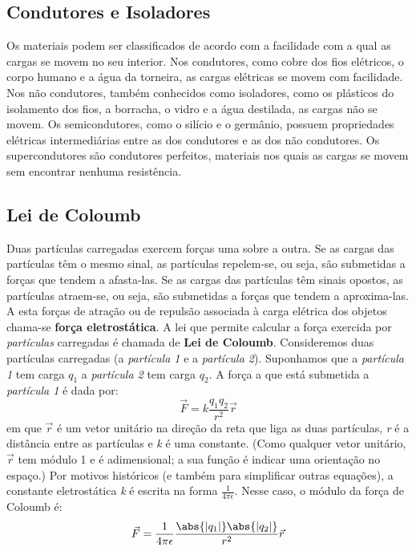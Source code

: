 \documentclass{article}
\begin{document}
\subsection{Condutores e Isoladores}
Os materiais podem ser classificados de acordo com a facilidade com a qual as cargas se movem no seu interior. Nos condutores, como cobre dos fios elétricos, o corpo humano e a água da torneira, as cargas elétricas se movem com facilidade. Nos não condutores, também conhecidos como isoladores, como os plásticos do isolamento dos fios, a borracha, o vidro e a água destilada, as cargas não se movem. Os semicondutores, como o silício e o germânio, possuem propriedades elétricas intermediárias entre as dos condutores e as dos não condutores. Os supercondutores são condutores perfeitos, materiais nos quais as cargas se movem sem encontrar nenhuma resistência.
\subsection{Lei de Coloumb}
Duas partículas carregadas exercem forças uma sobre a outra. Se as cargas das partículas têm o mesmo sinal, as partículas repelem-se, ou seja, são submetidas a forças que tendem a afasta-las. Se as cargas das partículas têm sinais opostos, as partículas atraem-se, ou seja, são submetidas a forças que tendem a aproxima-las.
A esta forças de atração ou de repulsão associada à carga elétrica dos objetos chama-se \textbf{força eletrostática}. A lei que permite calcular a força exercida por \textit{partículas} carregadas é chamada de \textbf{Lei de Coloumb}.
Consideremos duas partículas carregadas (a {\textit{partícula 1}} e a {\textit{partícula 2}}). Suponhamos que a \textit{partícula 1} tem carga \textit{$q_1$} a \textit{partícula 2} tem carga \textit{$q_2$}.
\newline
A força a que está submetida a \textit{partícula 1} é dada por:
\newline
\[ \vec{F} = k \frac{q_1 q_2}{r^2} \vec{r}\]
\newline
em que \(\vec{r}\) é um vetor unitário na direção da reta que liga as duas partículas, \textit{r} é a distância entre as partículas e \textit{k} é uma constante. (Como qualquer vetor unitário, \(\vec{r}\) tem módulo 1 e é adimensional; a sua função é indicar uma orientação no espaço.)
Por motivos históricos (e também para simplificar outras equações), a constante eletrostática \textit{k} é escrita na forma \(\frac{1}{4 \pi \epsilon}\). Nesse caso, o módulo da força de Coloumb é:
\newline
\[ \vec{F} = \frac{1}{4 \pi \epsilon} \frac{\abs{|q_1|} \abs{|q_2|}}{r^2} \vec{r}\]
\newline
\end{document}

